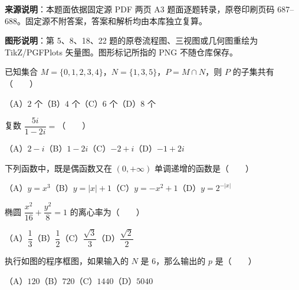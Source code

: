 


\begin{gktip}
\textbf{来源说明}：本题面依据固定源 PDF 两页 A3 题面逐题转录，原卷印刷页码 687–688。固定源不附答案，答案和解析均由本库独立复算。

\textbf{图形说明}：第 5、8、18、22 题的原卷流程图、三视图或几何图重绘为 TikZ/PGFPlots 矢量图。图形标记所指的 PNG 不随仓库保存。
\end{gktip}


\begin{question}
已知集合 $M=\{0,1,2,3,4\}$，$N=\{1,3,5\}$，$P=M\cap N$，则 $P$ 的子集共有\mbox{（　　）}

（A）$2$ 个\quad（B）$4$ 个\quad（C）$6$ 个\quad（D）$8$ 个

\end{question}
\begin{question}
复数 $\dfrac{5i}{1-2i}=$\mbox{（　　）}

（A）$2-i$\quad（B）$1-2i$\quad（C）$-2+i$\quad（D）$-1+2i$

\end{question}
\begin{question}
下列函数中，既是偶函数又在 $(0,+\infty)$ 单调递增的函数是\mbox{（　　）}

（A）$y=x^3$\quad（B）$y=|x|+1$\quad（C）$y=-x^2+1$\quad（D）$y=2^{-|x|}$

\end{question}
\begin{question}
椭圆 $\dfrac{x^2}{16}+\dfrac{y^2}{8}=1$ 的离心率为\mbox{（　　）}

（A）$\dfrac13$\quad（B）$\dfrac12$\quad（C）$\dfrac{\sqrt3}{3}$\quad（D）$\dfrac{\sqrt2}{2}$

\Needspace{0.4\textheight}
\end{question}
\begin{question}
执行如图的程序框图，如果输入的 $N$ 是 $6$，那么输出的 $p$ 是\mbox{（　　）}
\nopagebreak[4]
\begin{center}\end{center}
\nopagebreak[4]
（A）$120$\quad（B）$720$\quad（C）$1440$\quad（D）$5040$

\end{question}
